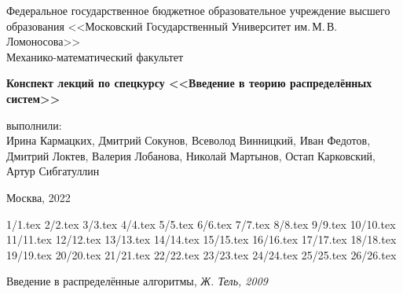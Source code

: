\documentclass[specialist, subf, href, colorlinks=true, 12pt, times, mtpro, final]{disser}
\theoremstyle{definition}
\begin{document}
\begin{titlepage}
	\begin{center}
		
		Федеральное государственное бюджетное образовательное учреждение высшего образования 
		<<Московский Государственный Университет им.\,М.\,В.\,Ломоносова>>\\
		
		\vspace{9cm}
		Механико-математический факультет
		
		{\bf Конспект лекций по спецкурсу <<Введение в теорию распределённых систем>>}
		
		\vspace{9cm}
		\begin{flushright}
			{ выполнили:}\\
			Ирина Кармацких, Дмитрий Сокунов, Всеволод Винницкий, Иван Федотов, Дмитрий Локтев, Валерия Лобанова, Николай Мартынов, Остап Карковский, Артур Сибгатуллин\\[0.5cm]
		\end{flushright}
		\vspace{1cm}
		
		\normalsize Москва, 2022
	\end{center}
\end{titlepage}

	
\tableofcontents
	
 {1/1.tex}
 {2/2.tex}
 {3/3.tex}
 {4/4.tex}
 {5/5.tex}
 {6/6.tex}
 {7/7.tex}
 {8/8.tex}
 {9/9.tex}
 {10/10.tex}
 {11/11.tex}
 {12/12.tex}
 {13/13.tex}
 {14/14.tex}
 {15/15.tex}
 {16/16.tex}
 {17/17.tex}
 {18/18.tex}
 {19/19.tex}
 {20/20.tex}
 {21/21.tex}
 {22/22.tex}
 {23/23.tex}
 {24/24.tex}
 {25/25.tex}
 {26/26.tex}

\newpage
\begin{thebibliography}{100}
	 Введение в распределённые алгоритмы,
    \emph{Ж. Тель, 2009}
	
\end{thebibliography}
\end{document}
